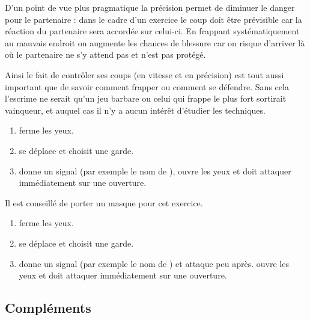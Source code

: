 D'un point de vue plus pragmatique la précision permet de diminuer le danger pour le partenaire : dans le cadre d'un exercice le coup doit être prévisible car la réaction du partenaire sera accordée sur celui-ci.
En frappant systématiquement au mauvais endroit on augmente les chances de blessure car on risque d'arriver là où le partenaire ne s'y attend pas et n'est pas protégé.

Ainsi le fait de contrôler ses coups (en vitesse et en précision) est tout aussi important que de savoir comment frapper ou comment se défendre.
Sans cela l'escrime ne serait qu'un jeu barbare ou celui qui frappe le plus fort sortirait vainqueur, et auquel cas il n'y a aucun intérêt d'étudier les techniques.


\begin{exercice}

	\begin{enumerate}
		\item \A ferme les yeux.
		
		\item \D se déplace et choisit une garde.
		
		\item \D donne un signal (par exemple le nom de \A), \A ouvre les yeux et doit attaquer immédiatement sur une ouverture.
	\end{enumerate}

	Il est conseillé de porter un masque pour cet exercice.
\end{exercice}


\begin{exercice}

	\begin{enumerate}
		\item \A ferme les yeux.
		
		\item \D se déplace et choisit une garde.
		
		\item \D donne un signal (par exemple le nom de \A) et attaque peu après.
		\A ouvre les yeux et doit attaquer immédiatement sur une ouverture.
	\end{enumerate}
\end{exercice}



\subsection{Compléments}


